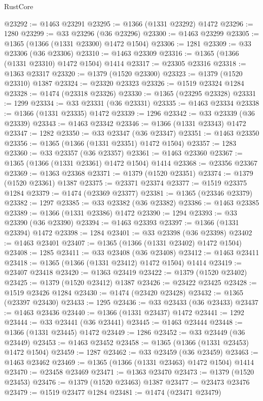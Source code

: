 \begin{lexlean}{RustCore}
\begin{coremodule}
@23292 := @1463 @23291
@23295 := @1366 (@1331 @23292) @1472
@23296 := 1280
@23299 := @33 @23296 (@36 @23296)
@23300 := @1463 @23299
@23305 := @1365 (@1366 (@1331 @23300) @1472 @1504)
@23306 := 1281
@23309 := @33 @23306 (@36 @23306)
@23310 := @1463 @23309
@23316 := @1365 (@1366 (@1331 @23310) @1472 @1504) @1414
@23317 := @23305 @23316
@23318 := @1363 @23317
@23320 := @1379 (@1520 @23300)
@23323 := @1379 (@1520 @23310) @1387
@23324 := @23320 @23323
@23326 := @1519 @23324 @1284
@23328 := @1474 (@23318 @23326)
@23330 := @1365 (@23295 @23328)
@23331 := 1299
@23334 := @33 @23331 (@36 @23331)
@23335 := @1463 @23334
@23338 := @1366 (@1331 @23335) @1472
@23339 := 1296
@23342 := @33 @23339 (@36 @23339)
@23343 := @1463 @23342
@23346 := @1366 (@1331 @23343) @1472
@23347 := 1282
@23350 := @33 @23347 (@36 @23347)
@23351 := @1463 @23350
@23356 := @1365 (@1366 (@1331 @23351) @1472 @1504)
@23357 := 1283
@23360 := @33 @23357 (@36 @23357)
@23361 := @1463 @23360
@23367 := @1365 (@1366 (@1331 @23361) @1472 @1504) @1414
@23368 := @23356 @23367
@23369 := @1363 @23368
@23371 := @1379 (@1520 @23351)
@23374 := @1379 (@1520 @23361) @1387
@23375 := @23371 @23374
@23377 := @1519 @23375 @1284
@23379 := @1474 (@23369 @23377)
@23381 := @1365 (@23346 @23379)
@23382 := 1297
@23385 := @33 @23382 (@36 @23382)
@23386 := @1463 @23385
@23389 := @1366 (@1331 @23386) @1472
@23390 := 1294
@23393 := @33 @23390 (@36 @23390)
@23394 := @1463 @23393
@23397 := @1366 (@1331 @23394) @1472
@23398 := 1284
@23401 := @33 @23398 (@36 @23398)
@23402 := @1463 @23401
@23407 := @1365 (@1366 (@1331 @23402) @1472 @1504)
@23408 := 1285
@23411 := @33 @23408 (@36 @23408)
@23412 := @1463 @23411
@23418 := @1365 (@1366 (@1331 @23412) @1472 @1504) @1414
@23419 := @23407 @23418
@23420 := @1363 @23419
@23422 := @1379 (@1520 @23402)
@23425 := @1379 (@1520 @23412) @1387
@23426 := @23422 @23425
@23428 := @1519 @23426 @1284
@23430 := @1474 (@23420 @23428)
@23432 := @1365 (@23397 @23430)
@23433 := 1295
@23436 := @33 @23433 (@36 @23433)
@23437 := @1463 @23436
@23440 := @1366 (@1331 @23437) @1472
@23441 := 1292
@23444 := @33 @23441 (@36 @23441)
@23445 := @1463 @23444
@23448 := @1366 (@1331 @23445) @1472
@23449 := 1286
@23452 := @33 @23449 (@36 @23449)
@23453 := @1463 @23452
@23458 := @1365 (@1366 (@1331 @23453) @1472 @1504)
@23459 := 1287
@23462 := @33 @23459 (@36 @23459)
@23463 := @1463 @23462
@23469 := @1365 (@1366 (@1331 @23463) @1472 @1504) @1414
@23470 := @23458 @23469
@23471 := @1363 @23470
@23473 := @1379 (@1520 @23453)
@23476 := @1379 (@1520 @23463) @1387
@23477 := @23473 @23476
@23479 := @1519 @23477 @1284
@23481 := @1474 (@23471 @23479)

\end{coremodule}
\end{lexlean}

